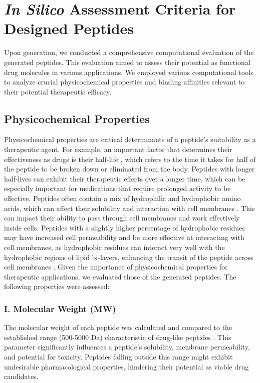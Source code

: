 \section{\textit{In Silico} Assessment Criteria for Designed Peptides}
Upon generation, we conducted a comprehensive computational evaluation of the generated peptides. This evaluation aimed to assess their potential as functional drug molecules in various applications. We employed various computational tools to analyze crucial physicochemical properties and binding affinities relevant to their potential therapeutic efficacy.

\subsection{Physicochemical Properties}
Physicochemical properties are critical determinants of a peptide's suitability as a therapeutic agent. For example, an important factor that determines their effectiveness as drugs is their half-life \cite{nugrahadi2023designing}, which refers to the time it takes for half of the peptide to be broken down or eliminated from the body. Peptides with longer half-lives can exhibit their therapeutic effects over a longer time, which can be especially important for medications that require prolonged activity to be effective. Peptides often contain a mix of hydrophilic and hydrophobic amino acids, which can affect their solubility and interaction with cell membranes \cite{madani2011mechanisms}. This can impact their ability to pass through cell membranes and work effectively inside cells. Peptides with a slightly higher percentage of hydrophobic residues may have increased cell permeability \cite{madani2011mechanisms} and be more effective at interacting with cell membranes, as hydrophobic residues can interact very well with the hydrophobic regions of lipid bi-layers, enhancing the transit of the peptide across cell membranes \cite{madani2011mechanisms}. Given the importance of physicochemical properties for therapeutic applications, we evaluated those of the generated peptides. The following properties were assessed:

\subsubsection*{I. Molecular Weight (MW)}
The molecular weight of each peptide was calculated and compared to the established range (500-5000 Da) characteristic of drug-like peptides \cite{erckes2022story}. This parameter significantly influences a peptide's solubility, membrane permeability, and potential for toxicity. Peptides falling outside this range might exhibit undesirable pharmacological properties, hindering their potential as viable drug candidates.

